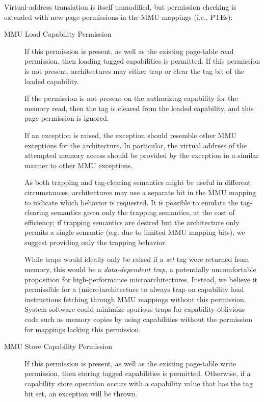 Virtual-address translation is itself unmodified, but permission checking is
extended with new page permissions in the MMU mappings (i.e., PTEs):

\begin{description}
\item[MMU Load Capability Permission]
If this permission is present, as well as the existing page-table read
permission, then loading tagged capabilities is permitted.
If this permission is not present, architectures may either trap or
clear the tag bit of the loaded capability.

If the \cappermLC permission is not present on the authorizing capability for
the memory read, then the tag is cleared from the loaded capability, and this
page permission is ignored.

If an exception is raised, the exception should resemble other MMU
exceptions for the architecture.  In particular, the virtual address
of the attempted memory access should be provided by the exception in
a similar manner to other MMU exceptions.

As both trapping and tag-clearing semantics might be useful in different
circumstances, architectures may use a separate
bit in the MMU mapping to indicate which behavior is requested.
It is possible to emulate the tag-clearing semantics given only the trapping
semantics, at the cost of efficiency; if trapping semantics are
desired but the architecture only permits a single semantic (e.g. due
to limited MMU mapping bits), we suggest providing only the trapping behavior.

While traps would ideally only be
raised if a \emph{set} tag were returned from memory, this would be a
\emph{data-dependent trap}, a potentially uncomfortable proposition for
high-performance microarchitectures.  Instead, we believe it permissible for a
(micro)architecture to always trap on capability load instructions fetching
through MMU mappings without this permission.  System software could
minimize spurious traps for capability-oblivious code such as memory
copies by using capabilities without the \cappermLC permission for
mappings lacking this permission.

\item[MMU Store Capability Permission]
If this permission is present, as well as the existing page-table write
permission, then storing tagged capabilities is permitted.
Otherwise, if a capability store operation occurs with a capability value that
has the tag bit set, an exception will be thrown.


\end{description}
